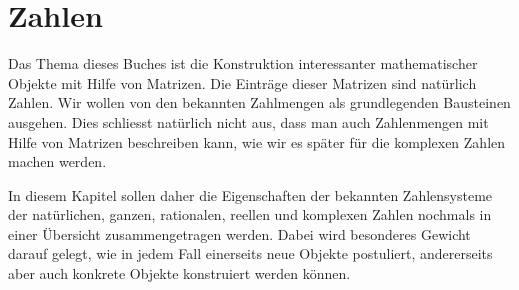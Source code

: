 %
%
%
\chapter{Zahlen
\label{buch:chapter:zahlen}}
\rhead{}

Das Thema dieses Buches ist die Konstruktion interessanter 
mathematischer Objekte mit Hilfe von Matrizen.
Die Einträge dieser Matrizen sind natürlich Zahlen.
Wir wollen von den bekannten Zahlmengen als grundlegenden
Bausteinen ausgehen.
Dies schliesst natürlich nicht aus, dass man auch Zahlenmengen
mit Hilfe von Matrizen beschreiben kann, wie wir es später für die
komplexen Zahlen machen werden.

In diesem Kapitel sollen daher die Eigenschaften der bekannten
Zahlensysteme der natürlichen, ganzen, rationalen, reellen und
komplexen Zahlen nochmals in einer Übersicht zusammengetragen
werden.
Dabei wird besonderes Gewicht darauf gelegt, wie in jedem Fall
einerseits neue Objekte postuliert, andererseits
aber auch konkrete Objekte konstruiert werden können.








